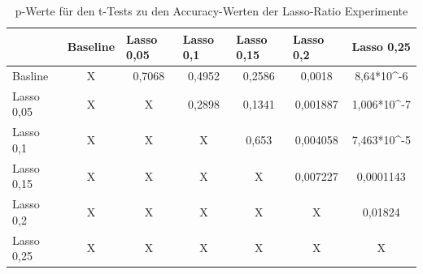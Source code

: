 \begin{table}[]
\caption{p-Werte für den t-Tests zu den Accuracy-Werten der Lasso-Ratio Experimente}
\begin{tabular}{l|c|c|c|c|c|c|}
\cline{2-7}
                                 & \multicolumn{1}{l|}{Baseline} & \multicolumn{1}{l|}{Lasso 0,05} & \multicolumn{1}{l|}{Lasso 0,1} & \multicolumn{1}{l|}{Lasso 0,15} & \multicolumn{1}{l|}{Lasso 0,2} & \multicolumn{1}{l|}{Lasso 0,25} \\ \hline
\multicolumn{1}{|l|}{Basline}    & X                             & \cellcolor[HTML]{FE0000}0,7068  & \cellcolor[HTML]{FE0000}0,4952 & \cellcolor[HTML]{FE0000}0,2586  & 0,0018                         & 8,64*10\textasciicircum{}-6     \\ \hline
\multicolumn{1}{|l|}{Lasso 0,05} & X                             & X                               & \cellcolor[HTML]{FE0000}0,2898 & \cellcolor[HTML]{FE0000}0,1341  & 0,001887                       & 1,006*10\textasciicircum{}-7    \\ \hline
\multicolumn{1}{|l|}{Lasso 0,1}  & X                             & X                               & X                              & \cellcolor[HTML]{FE0000}0,653   & 0,004058                       & 7,463*10\textasciicircum{}-5    \\ \hline
\multicolumn{1}{|l|}{Lasso 0,15} & X                             & X                               & X                              & X                               & 0,007227                       & 0,0001143                       \\ \hline
\multicolumn{1}{|l|}{Lasso 0,2}  & X                             & X                               & X                              & X                               & X                              & 0,01824                         \\ \hline
\multicolumn{1}{|l|}{Lasso 0,25} & X                             & X                               & X                              & X                               & X                              & X                               \\ \hline
\end{tabular}
\label{tab:lasso2}
\end{table}



